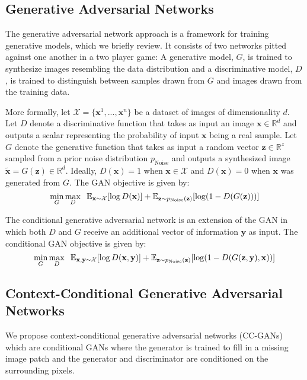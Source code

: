 \documentclass{article} \usepackage{iclr2017_conference,times}
\newcommand{\pnoise}{p_{\text{Noise}}}
\newcommand {\R}{\mathbb {R}}
\begin{document}
\subsection{Generative Adversarial Networks}
The generative adversarial network approach \citep{goodfellow2014} is a
framework for training generative models, which we briefly review.  
It consists of two networks pitted against one another in a two player game:
A generative model, $G$, is trained to synthesize images resembling the data distribution and a discriminative model, $D$, is trained to distinguish between samples drawn from $G$ and images drawn from the training data.

More formally, let $\mathcal{X} = \{\mathbf{x}^1, ..., \mathbf{x}^n\}$ be a dataset of images of dimensionality $d$.
Let $D$ denote a discriminative function that takes as input an image $\mathbf{x} \in \R^d$ and outputs a scalar representing the probability  of input $\mathbf{x}$ being a real sample.
Let $G$ denote the generative function that takes as input a random vector $\mathbf{z} \in \R^z$ sampled from a prior noise distribution $\pnoise$ and outputs a synthesized image $\mathbf{\tilde{x}} = G(\mathbf{z}) \in \R^d$. Ideally, $D(\mathbf{x}) = 1$ when $\mathbf{x} \in \mathcal{X}$ and $D(\mathbf{x}) = 0$ when $\mathbf{x}$ was generated from $G$.
The GAN objective is given by:
\begin{equation}
\label{eqn:gan}
\min_G \max_D \hspace{2mm} \mathbb{E}_{\mathbf{x}\sim \mathcal{X}}[\log D(\mathbf{x})]  +
\mathbb{E}_{\mathbf{z} \sim \pnoise(\mathbf{z})} [\log(1 - D(G(\mathbf{z})))]
\end{equation}

The conditional generative adversarial network \citep{mirza14} is an extension of the GAN in which both $D$ and $G$ receive an additional vector of information $\mathbf{y}$ as input. The conditional GAN objective is given by:
\begin{equation}
\label{eqn:cgan}
\min_G \max_D \hspace{2mm} \mathbb{E}_{\mathbf{x, y}\sim \mathcal{X}}[\log D(\mathbf{x, y})]  +
\mathbb{E}_{\mathbf{z} \sim \pnoise(\mathbf{z})} [\log(1 - D(G(\mathbf{z, y}), \mathbf{x}))]
\end{equation}


\subsection{Context-Conditional Generative Adversarial Networks}
We propose context-conditional generative adversarial networks (CC-GANs) which are
conditional GANs where the generator is trained to
fill in a missing image patch and the generator and discriminator are
conditioned on the surrounding pixels. 
\end{document}
